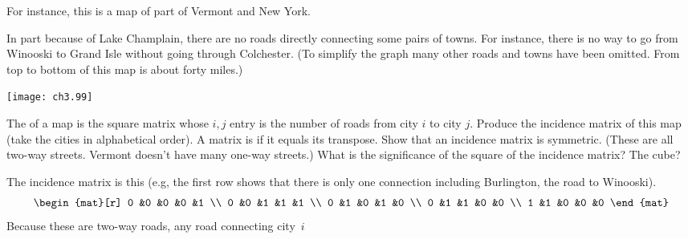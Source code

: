 \begin{exercises}
    For instance, this is a map of part of Vermont and New York.
    \begin{center}
      \parbox{2in}{In part because of Lake Champlain, there are
                      no roads directly connecting some pairs of towns.
                      For instance, there is no way to go from
                      Winooski to Grand Isle without going through
                      Colchester.
                      (To simplify the graph many other roads and towns
                      have been omitted.
                      From top to bottom of this map is
                      about forty miles.)}
      \quad
      \parbox{2in}{\texttt{[image: ch3.99]}}
    \end{center}
    \begin{exparts}
      \partsitem The %
        of a map is the square matrix
        whose \( i,j \) entry is the number of roads from city \( i \)
        to city \( j \).
        Produce the incidence matrix of this map (take the cities in
        alphabetical order).
      \partsitem A matrix is 
        if it equals its transpose.
        Show that an incidence matrix is symmetric.
        (These are all two-way streets.
        Vermont doesn't have many one-way streets.)
      \partsitem What is the significance of the square of the 
        incidence matrix?
        The cube?
    \end{exparts}
    \begin{answer}
      \begin{exparts}
        \partsitem The incidence matrix is this
          (e.g, the first row shows that there is only one connection
          including Burlington, the road to Winooski).
          \begin{equation*}
            \begin{mat}[r]
              0  &0  &0  &0  &1  \\
              0  &0  &1  &1  &1  \\
              0  &1  &0  &1  &0  \\
              0  &1  &1  &0  &0  \\
              1  &1  &0  &0  &0
            \end{mat}
          \end{equation*}
        \partsitem Because these are two-way roads, 
          any road connecting city~\( i \)

\end{exparts}
\end{answer}
\end{exercises}
